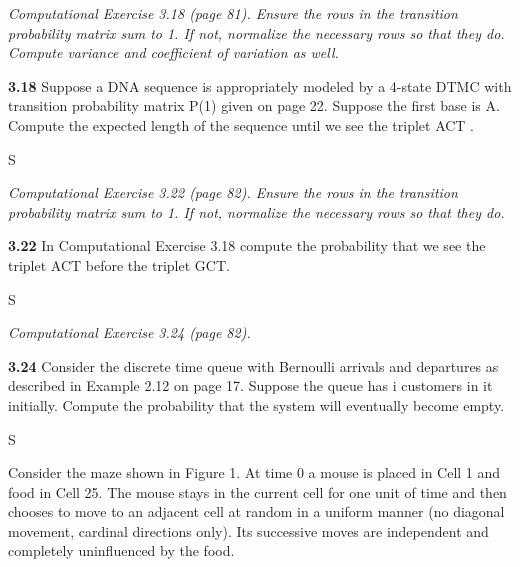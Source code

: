 \documentclass[answers]{exam}
\begin{document}
\begin{questions}
\question
\textit{Computational Exercise 3.18 (page 81). 
	Ensure the rows in the transition probability matrix sum to 1. 
	If not, normalize the necessary rows so that they do. 
	Compute variance and coefficient of variation as well.}

\textbf{3.18} Suppose a DNA sequence is appropriately modeled by a 
4-state DTMC with transition probability matrix P(1) given on page 22. 
Suppose the first base is A. 
Compute the expected length of the sequence until we see the triplet ACT .

\begin{solution}
	S
\end{solution}

\question 
\textit{Computational Exercise 3.22 (page 82). 
	Ensure the rows in the transition probability matrix sum to 1. 
	If not, normalize the necessary rows so that they do.}

\textbf{3.22} In Computational Exercise 3.18 compute the probability 
that we see the triplet ACT before the triplet GCT.

\begin{solution}
	S
\end{solution}

\question 
\textit{Computational Exercise 3.24 (page 82).}

\textbf{3.24} Consider the discrete time queue with 
Bernoulli arrivals and departures as described in Example 2.12 on page 17. 
Suppose the queue has i customers in it initially. 
Compute the probability that the system will eventually become empty.

\begin{solution}
	S
\end{solution}

\question 
	Consider the maze shown in Figure {\color{red} 1}. 
	At time 0 a mouse is placed in Cell 1 and food in Cell 25. 
	The mouse stays in the current cell for one unit of time and 
	then chooses to move to an adjacent cell at random in a uniform manner 
	(no diagonal movement, cardinal directions only). 
	Its successive moves are independent and completely uninfluenced by the food.
	

\end{questions}
\end{document}
